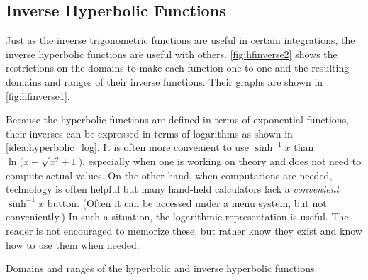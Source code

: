\subsection{Inverse Hyperbolic Functions}

Just as the inverse trigonometric functions are useful in certain integrations, the inverse hyperbolic functions are useful with others. \autoref{fig:hfinverse2} shows the restrictions on the domains to make each function one-to-one and the resulting domains and ranges of their inverse functions. Their graphs are shown in \autoref{fig:hfinverse1}.

Because the hyperbolic functions are defined in terms of exponential functions, their inverses can be expressed in terms of logarithms as shown in \autoref{idea:hyperbolic_log}. It is often more convenient to use $\sinh^{-1}x$ than $\ln\bigl(x+\sqrt{x^2+1}\bigr)$, especially when one is working on theory and does not need to compute actual values. On the other hand, when computations are needed, technology is often helpful but many hand-held calculators lack a \emph{convenient} $\sinh^{-1}x$ button. (Often it can be accessed under a menu system, but not conveniently.) In such a situation, the logarithmic representation is useful. The reader is not encouraged to memorize these, but rather know they exist and know how to use them when needed.

\noindent\begin{minipage}[t]{\linewidth}\noindent%
\captionsetup{type=figure}%
\flushinner{%
\small
\tagpdfsetup{table/header-rows={1}}
\begin{tabular}{ l c c @{\hspace{2em}} c c c }
Function & Domain & Range & Function & Domain & Range \\ \cmidrule(r{2em}){1-3} \cmidrule(l{-1em}){4-6}
$\cosh x$ & $[0,\infty)$ & $[1,\infty)$ &
 $\cosh^{-1} x$ & $[1,\infty)$ & $[0,\infty)$ \\
$\sinh x$ & $(-\infty,\infty)$ & $(-\infty,\infty)$ &
 $\sinh^{-1} x$ & $(-\infty,\infty)$ & $(-\infty,\infty)$\\
$\tanh x$ & $(-\infty,\infty)$ & $(-1,1)$ &
 $\tanh^{-1} x$ & $(-1,1)$ & $(-\infty,\infty)$\\
$\sech x$ & $[0,\infty)$ & $(0,1]$ & $\sech^{-1} x$ & $(0,1]$ & $[0,\infty)$\\
$\csch x$ & $(-\infty,0) \cup (0,\infty)$ & $(-\infty,0) \cup (0,\infty)$ &
 $\csch^{-1} x$ & $(-\infty,0) \cup (0,\infty)$ & $(-\infty,0) \cup (0,\infty)$\\
$\coth x$ & $(-\infty,0) \cup (0,\infty)$ & $(-\infty,-1) \cup (1,\infty)$ &
 $\coth^{-1} x$ & $(-\infty,-1) \cup (1,\infty)$ & $(-\infty,0) \cup (0,\infty)$
\end{tabular}}
\caption{Domains and ranges of the hyperbolic and inverse hyperbolic functions.}
\label{fig:hfinverse2}
\end{minipage}

